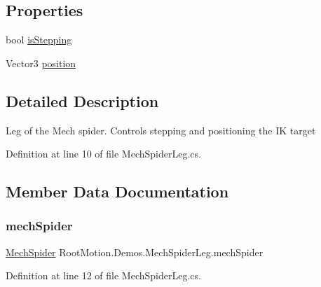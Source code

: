 \subsection*{Properties}
\begin{DoxyCompactItemize}
\item 
bool \mbox{\hyperlink{class_root_motion_1_1_demos_1_1_mech_spider_leg_ab79ce4101d3cffe888dc24f503792f4f}{is\+Stepping}}
\item 
Vector3 \mbox{\hyperlink{class_root_motion_1_1_demos_1_1_mech_spider_leg_aef09d6b598ecee61fb3cae6eccc884d9}{position}}
\end{DoxyCompactItemize}


\subsection{Detailed Description}
Leg of the Mech spider. Controls stepping and positioning the IK target 



Definition at line 10 of file Mech\+Spider\+Leg.\+cs.



\subsection{Member Data Documentation}
\mbox{\label{class_root_motion_1_1_demos_1_1_mech_spider_leg_ab5a0a85fd7a44f1a79f9bac591dab9a5}} 
\subsubsection{\texorpdfstring{mech\+Spider}{mechSpider}}
{\footnotesize\ttfamily \mbox{\hyperlink{class_root_motion_1_1_demos_1_1_mech_spider}{Mech\+Spider}} Root\+Motion.\+Demos.\+Mech\+Spider\+Leg.\+mech\+Spider}



Definition at line 12 of file Mech\+Spider\+Leg.\+cs.

\mbox{\label{class_root_motion_1_1_demos_1_1_mech_spider_leg_ad97fc136036834c447e6bec5ed500264}} 
